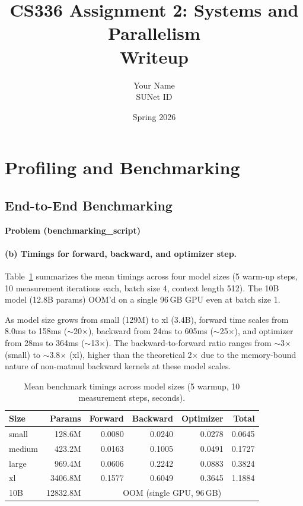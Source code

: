 \documentclass[11pt]{article}
\title{\textbf{CS336 Assignment 2: Systems and Parallelism} \\ Writeup}
\author{Your Name \\ SUNet ID}
\date{Spring 2026}
\begin{document}
\maketitle
\tableofcontents
\newpage

\section{Profiling and Benchmarking}

\subsection{End-to-End Benchmarking}
\textbf{Problem (benchmarking\_script)}

\paragraph{(b) Timings for forward, backward, and optimizer step.}

Table~\ref{tab:benchmark-summary} summarizes the mean timings across four model sizes
(5 warm-up steps, 10 measurement iterations each, batch size 4, context length 512).
The 10B model (12.8B params) OOM'd on a single 96\,GB GPU even at batch size 1.

As model size grows from small (129M) to xl (3.4B),
forward time scales from 8.0ms to 158ms ($\sim$20$\times$),
backward from 24ms to 605ms ($\sim$25$\times$),
and optimizer from 28ms to 364ms ($\sim$13$\times$).
The backward-to-forward ratio ranges from $\sim$3$\times$ (small) to $\sim$3.8$\times$ (xl),
higher than the theoretical 2$\times$ due to the memory-bound nature of
non-matmul backward kernels at these model scales.

\begin{table}[H]
\centering
\caption{Mean benchmark timings across model sizes (5 warmup, 10 measurement steps, seconds).}
\label{tab:benchmark-summary}
\begin{tabular}{lrrrrr}
  \toprule
  Size & Params & Forward & Backward & Optimizer & Total \\
  \midrule
  small  & 128.6M & 0.0080 & 0.0240 & 0.0278 & 0.0645 \\
  medium & 423.2M & 0.0163 & 0.1005 & 0.0491 & 0.1727 \\
  large  & 969.4M & 0.0606 & 0.2242 & 0.0883 & 0.3824 \\
  xl     & 3406.8M & 0.1577 & 0.6049 & 0.3645 & 1.1884 \\
  10B    & 12832.8M & \multicolumn{4}{c}{OOM (single GPU, 96\,GB)} \\
  \bottomrule
\end{tabular}
\end{table}
\end{document}
